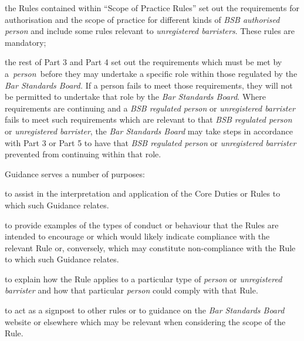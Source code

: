 \begin{numlist}
\begin{alphlist}
\item the Rules contained within ``Scope of Practice Rules'' set out the
requirements for authorisation and the scope of practice for different
kinds of \emph{BSB authorised person} and include some rules relevant to
\emph{unregistered barristers}. These rules are mandatory;

\item the rest of Part 3 and Part 4 set out the requirements which must be
met by a~\emph{person~}before they may undertake a specific role within
those regulated by the \emph{Bar Standards Board.} If a person fails to
meet those requirements, they will not be permitted to undertake that
role by the \emph{Bar Standards Board}. Where requirements are
continuing and a \emph{BSB regulated \emph{person}} or
\emph{unregistered barrister} fails to meet such requirements which are
relevant to that \emph{BSB regulated person} or \emph{unregistered
barrister}, the \emph{Bar Standards Board} may take steps in accordance
with Part 3 or Part 5 to have that \emph{BSB regulated person} or
\emph{unregistered barrister} prevented from continuing within that
role.
\end{alphlist}
\begin{alphlist}
\item Guidance serves a number of purposes:
\begin{romlist}
\item to assist in the interpretation and application of the Core Duties or
Rules to which such Guidance relates.

\item to provide examples of the types of conduct or behaviour that the
Rules are intended to encourage or which would likely indicate
compliance with the relevant Rule or, conversely, which may constitute
non-compliance with the Rule to which such Guidance relates.

\item to explain how the Rule applies to a particular type of
\emph{person} or \emph{unregistered barrister} and how that particular
\emph{person} could comply with that Rule.

\item to act as a signpost to other rules or to guidance on the \emph{Bar
Standards Board} website or elsewhere which may be relevant when
considering the scope of the Rule.


\end{romlist}
\end{alphlist}
\end{numlist}

